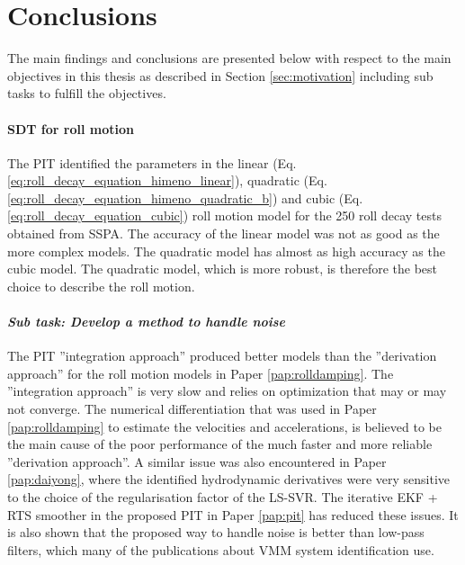 \chapter{Conclusions\label{ch:conclusions}}
The main findings and conclusions are presented below with respect to the main objectives in this thesis as described in Section \ref{sec:motivation} including sub tasks to fulfill the objectives.

\subsubsection*{SDT for roll motion}
The PIT identified the parameters in the linear (Eq.\ref{eq:roll_decay_equation_himeno_linear}), quadratic (Eq.\ref{eq:roll_decay_equation_himeno_quadratic_b}) and cubic (Eq.\ref{eq:roll_decay_equation_cubic}) roll motion model for the 250 roll decay tests obtained from SSPA. 
The accuracy of the linear model was not as good as the more complex models. The quadratic model has almost as high accuracy as the cubic model. The quadratic model, which is more robust, is therefore the best choice to describe the roll motion. 

\subsubsection*{\emph{Sub task: Develop a method to handle noise}}
The PIT ''integration approach'' produced better models than the ''derivation approach'' for the roll motion models in Paper \ref{pap:rolldamping}. The ''integration approach'' is very slow and relies on optimization that may or may not converge.
The numerical differentiation that was used in Paper \ref{pap:rolldamping} to estimate the velocities and accelerations, is believed to be the main cause of the poor performance of the much faster and more reliable ''derivation approach''. A similar issue was also encountered in Paper \ref{pap:daiyong}, where the identified hydrodynamic derivatives were very sensitive to the choice of the regularisation factor of the LS-SVR.
The iterative EKF + RTS smoother in the proposed PIT in Paper \ref{pap:pit} has reduced these issues. It is also shown that the proposed way to handle noise is better than low-pass filters, which many of the publications about VMM system identification use.

